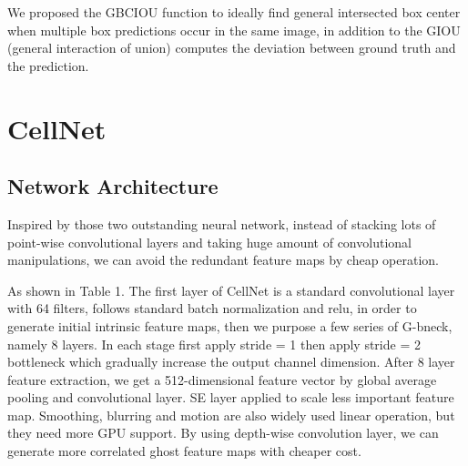 We proposed the GBCIOU function to ideally find general intersected box center when multiple box predictions occur in the same image, in addition to the GIOU (general interaction of union) computes the deviation between ground truth and the prediction.

\section{CellNet}
\label{sec:ipsum}


\subsection{Network Architecture} %
\label{sub:Network Architecture_2}
Inspired by those two outstanding neural network\cite{19}\cite{20}, instead of stacking lots of point-wise convolutional layers and taking huge amount of convolutional manipulations, we can avoid the redundant feature maps by cheap operation. 

As shown in Table 1. The first layer of CellNet is a standard convolutional layer with 64 filters, follows standard batch normalization and relu, in order to generate initial intrinsic feature maps, then we purpose a few series of G-bneck, namely 8 layers. In each stage first apply stride = 1 then apply stride = 2 bottleneck which gradually increase the output channel dimension. After 8 layer feature extraction, we get a 512-dimensional feature vector by global average pooling and convolutional layer. SE layer applied to scale less important feature map. Smoothing, blurring and motion are also widely used linear operation, but they need more GPU support. By using depth-wise convolution layer, we can generate more correlated ghost feature maps with cheaper cost.



